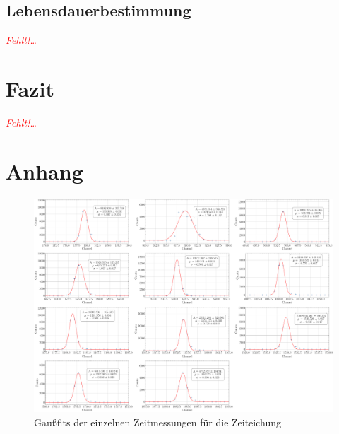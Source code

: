 \documentclass[12pt,a4paper,ngerman]{report}
\providecommand{\fehlt}{\textcolor{red}{\emph{Fehlt!\dots}}}
\begin{document}
		
	\section{Lebensdauerbestimmung}
		\fehlt


\chapter{Fazit}

	\listoffigures
	
	\begin{thebibliography}{111} %
		\fehlt
		
		
		
	\end{thebibliography}


\chapter*{Anhang} \label{ch:Anhang}
\FloatBarrier
	\begin{figure}[ht]
	\centering
	\includegraphics[width=\textwidth]{Bilder/timeGaussFits.pdf}		
	\caption{Gaußfits der einzelnen Zeitmessungen für die Zeiteichung}
	\label{img:TimeGauss}
\end{figure}
\end{document}
